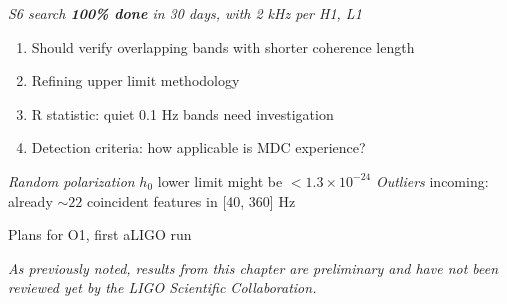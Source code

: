\emph{S6 search \textbf{100\% done} in 30 days, with 2 kHz per H1, L1}

\begin{enumerate}
\item Should verify overlapping bands with shorter coherence length
\item Refining upper limit methodology
\item R statistic: quiet 0.1 Hz bands need investigation
\item Detection criteria: how applicable is MDC experience?
\end{enumerate}

\emph{Random polarization} $h_0$ lower limit might be $< 1.3\times10^{-24}$
\emph{Outliers} incoming: already $\sim 22$ coincident features in [40, 360] Hz

Plans for O1, first aLIGO run


\textit{As previously noted, results from this chapter are preliminary and have not been reviewed yet by the LIGO Scientific Collaboration.}





